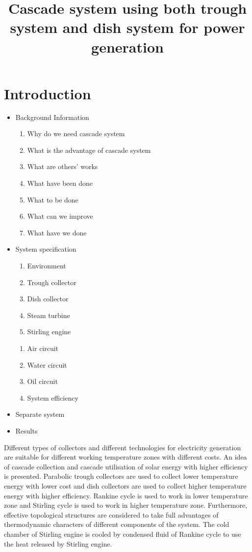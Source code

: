 \documentclass{article}
\begin{document}
\title{Cascade system using both trough system and dish system for power generation}
\date{}
\maketitle
\printnomenclature[2.5cm]{}

\newpage{}

\section{Introduction}
\begin{itemize}
    \item Background Information
    \begin{enumerate}
        \item Why do we need cascade system
        \item What is the advantage of cascade system
        \item What are others' works
        \item What have been done
        \item What to be done
        \item What can we improve
        \item What have we done
    \end{enumerate}
    \item System specification
    \begin{enumerate}
    	\item Environment
	\item Trough collector
	\item Dish collector
	\item Steam turbine
	\item Stirling engine
    \end{enumerate}
    \begin{enumerate}
    	\item Air circuit
	\item Water circuit
	\item Oil circuit
	\item System efficiency
    \end{enumerate}    
    \item Separate system
    \item Results
\end{itemize}

Different types of collectors and different technologies for electricity generation are suitable for different working temperature zones with different costs. An idea of cascade collection and cascade utilisation of solar energy with higher efficiency is presented. Parabolic trough collectors are used to collect lower temperature energy with lower cost and dish collectors are used to collect higher temperature energy with higher efficiency. Rankine cycle is used to work in lower temperature zone and Stirling cycle is used to work in higher temperature zone. Furthermore, effective topological structures are considered to take full advantages of thermodynamic characters of different components of the system. The cold chamber of Stirling engine is cooled by condensed fluid of Rankine cycle to use the heat released by Stirling engine. 
\end{document}
